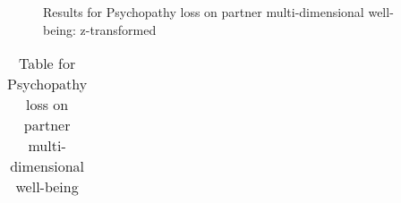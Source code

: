 \documentclass[
  singlecolumn]{article}
\begin{document}
\begin{figure}


\caption{\label{fig-results-psychopathy-loss}Results for Psychopathy
loss on partner multi-dimensional well-being: z-transformed}

\end{figure}%

\newpage{}

\begin{longtable}[]{@{}
  >{\raggedright\arraybackslash}p{}
  >{\raggedleft\arraybackslash}p{}
  >{\raggedleft\arraybackslash}p{}
  >{\raggedleft\arraybackslash}p{}
  >{\raggedleft\arraybackslash}p{}
  >{\raggedleft\arraybackslash}p{}@{}}

\caption{\label{tbl-results-psychopathy-loss}Table for Psychopathy loss
on partner multi-dimensional well-being}

\tabularnewline


\end{longtable}
\end{document}
